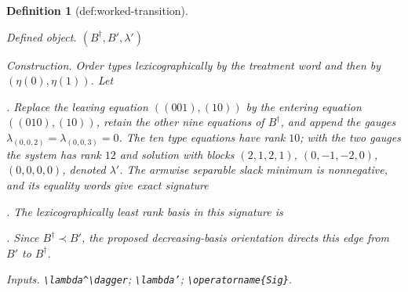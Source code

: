 \documentclass{article}
\newtheorem{definition}{Definition}
\begin{document}
\begin{definition}[def:worked-transition]\label{def:worked-transition}
\par\smallskip\noindent\emph{Defined object.} \((B^\dagger,B',\lambda')\)
\par\smallskip\noindent\emph{Construction.} Order types lexicographically by the treatment word and then by \((\eta(0),\eta(1))\). Let \par\noindent {}\par\noindent. Replace the leaving equation \(((001),(10))\) by the entering equation \(((010),(10))\), retain the other nine equations of \(B^\dagger\), and append the gauges \(\lambda_{(0,0,2)}=\lambda_{(0,0,3)}=0\). The ten type equations have rank \(10\); with the two gauges the system has rank \(12\) and solution with blocks \((2,1,2,1)\), \((0,-1,-2,0)\), \((0,0,0,0)\), denoted \(\lambda'\). The armwise separable slack minimum is nonnegative, and its equality words give exact signature \par\noindent {}\par\noindent. The lexicographically least rank basis in this signature is \par\noindent {}\par\noindent. Since \(B^\dagger\prec B'\), the proposed decreasing-basis orientation directs this edge from \(B'\) to \(B^\dagger\).
\par\smallskip\noindent\emph{Inputs.} \texttt{\textbackslash{}\allowbreak{}lambda\textasciicircum{}\textbackslash{}\allowbreak{}dagger}; \texttt{\textbackslash{}\allowbreak{}lambda'}; \texttt{\textbackslash{}\allowbreak{}operatorname\{Sig\}\allowbreak{}}.
\end{definition}
\end{document}
